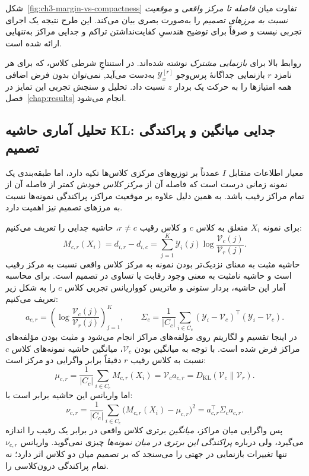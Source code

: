 شکل~\ref{fig:ch3-margin-vs-compactness}
تفاوت میان \emph{فاصله تا مرکز واقعی} و
\emph{موقعیت نسبت به مرزهای تصمیم} را
به‌صورت بصری بیان می‌کند. این طرح
نتیجه یک اجرای تجربی نیست و صرفاً
برای توضیح هندسیِ کفایت‌نداشتن
تراکم و جدایی مراکز به‌تنهایی
ارائه شده است.

 روابط بالا برای \emph{بازنمایی مشترک}
نوشته شده‌اند. در استنتاجِ شرطی کلاس، که برای هر نامزد
$r$ بازنمایی جداگانهٔ پرس‌وجو $\mathscr Y_x^{[r]}$ به‌دست می‌آید,
نمی‌توان بدون فرض اضافی همه امتیازها را به حرکت یک
بردار $z$ نسبت داد. تحلیل و سنجش تجربی این تمایز در
فصل~\ref{chap:results} انجام می‌شود.




\subsection{تحلیل آماری حاشیه KL: جدایی میانگین و پراکندگی تصمیم}
\label{subsec:ch3-margin-statistics}
معیار اطلاعات متقابل $I$ عمدتاً بر توزیع‌های مرکزی کلاس‌ها تکیه دارد، اما طبقه‌بندی یک نمونه زمانی درست است که فاصله آن از \emph{مرکز کلاس خودش} کمتر از فاصله آن از تمام مراکز رقیب باشد. به همین دلیل علاوه بر موقعیت مراکز، پراکندگی نمونه‌ها نسبت به مرزهای تصمیم نیز اهمیت دارد.

برای نمونه $X_i$ متعلق به کلاس $c$ و کلاس رقیب $r\ne c$، حاشیه جدایی را تعریف می‌کنیم:
\begin{equation}\label{eq:ch3-margin-definition}
\boxed{M_{c,r}(X_i)=d_{i,r}-d_{i,c}
=\sum_{j=1}^{K}\mathscr Y_i(j)
\log\frac{\mathcal V_c(j)}{\mathcal V_r(j)}.}
\end{equation}
حاشیه مثبت به معنای نزدیک‌تر بودن نمونه به مرکز کلاس واقعی نسبت به مرکز رقیب است و حاشیه نامثبت به معنی وجود رقابت یا تساوی در تصمیم است. برای محاسبه آمار این حاشیه، بردار ستونی و ماتریس کوواریانس تجربی کلاس $c$ را به شکل زیر تعریف می‌کنیم:
\begin{equation}\label{eq:ch3-margin-coeff-cov}
a_{c,r}=\left(\log\frac{\mathcal V_c(j)}{\mathcal V_r(j)}\right)_{j=1}^{K},
\qquad
\Sigma_c=\frac1{|C_c|}\sum_{i\in C_c}
(\mathscr Y_i-\mathcal V_c)^\top
(\mathscr Y_i-\mathcal V_c).
\end{equation}
در اینجا تقسیم و لگاریتم روی مؤلفه‌های مراکز انجام می‌شود و مثبت بودن مؤلفه‌های مراکز فرض شده است. با توجه به میانگین بودن $\mathcal V_c$، میانگین حاشیه نمونه‌های کلاس $c$ نسبت به کلاس رقیب $r$ دقیقاً برابر واگرایی دو مرکز است:
\begin{equation}\label{eq:ch3-margin-mean}
\boxed{
\mu_{c,r}=\frac1{|C_c|}\sum_{i\in C_c}M_{c,r}(X_i)
=\mathcal V_c a_{c,r}
=D_{\mathrm{KL}}(\mathcal V_c\|\mathcal V_r).}
\end{equation}
اما واریانس این حاشیه برابر است با:
\begin{equation}\label{eq:ch3-margin-variance}
\boxed{
\nu_{c,r}=\frac1{|C_c|}\sum_{i\in C_c}
\bigl(M_{c,r}(X_i)-\mu_{c,r}\bigr)^2
=a_{c,r}^{\top}\Sigma_c a_{c,r}.}
\end{equation}
پس واگرایی میان مراکز، \emph{میانگین} برتری کلاس واقعی در برابر یک رقیب را اندازه می‌گیرد، ولی درباره \emph{پراکندگی این برتری در میان نمونه‌ها} چیزی نمی‌گوید. واریانس $\nu_{c,r}$ تنها تغییرات بازنمایی در جهتی را می‌سنجد که بر تصمیم میان دو کلاس اثر دارد؛ نه تمام پراکندگی درون‌کلاسی را.

